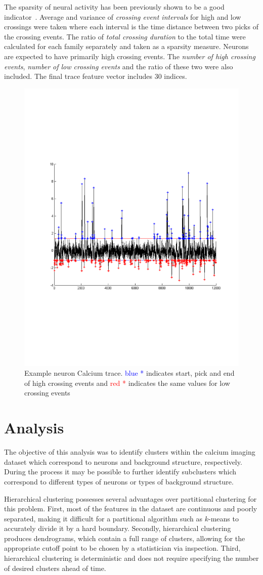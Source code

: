 \documentclass[10pt]{article}
\begin{document}
The sparsity of neural activity has been previously shown to be a good indicator~\cite{Kim2011}. Average and variance of \emph{crossing event intervals} for high and low crossings were taken where each interval is the time distance between two picks of the crossing events.  The ratio of \emph{total crossing duration} to the total time were calculated for each family separately and taken as a sparsity measure. Neurons are expected to have primarily high crossing events. The \emph{number of high crossing events}, \emph{number of low crossing events} and the ratio of these two were also included. The final trace feature vector includes \num{30} indices.

\begin{figure}[h]
    \centering

    \begin{minipage}{1\textwidth}
      \centering
      \includegraphics[width=0.4\linewidth]{figs/trace.pdf}
      \caption{\footnotesize Example neuron Calcium trace. \textcolor{blue}{blue *} indicates start, pick and end of high crossing events and \textcolor{red}{red *} indicates the same values for low crossing events }
      \label{fig:trace}
    \end{minipage}
\end{figure}

\section{Analysis}

The objective of this analysis was to identify clusters within the calcium imaging dataset which correspond to neurons and background structure, respectively. During the process it may be possible to further identify subclusters which correspond to different types of neurons or types of background structure.

Hierarchical clustering possesses several advantages over partitional clustering for this problem.
First, most of the features in the dataset are continuous and poorly separated, making it difficult for a partitional algorithm such as $k$-means to accurately divide it by a hard boundary. 
Secondly, hierarchical clustering produces dendrograms, which contain a full range of clusters, allowing for the appropriate cutoff point to be chosen by a statistician via inspection. 
Third, hierarchical clustering is deterministic and does not require specifying the number of desired clusters ahead of time.
\end{document}
